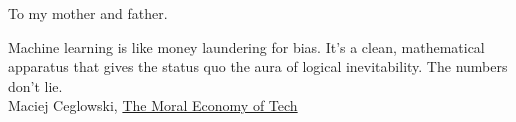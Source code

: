 

\copyrightpage  %

\commcertpage   %

\titlepage      %


\begin{dedication}		%
\begin{center}
    To my mother and father.
\end{center}
\end{dedication}

\begin{epigraph}		%
    \begin{center}
        Machine learning is like money laundering for bias.  It’s a clean, mathematical apparatus that gives the status quo the aura of logical inevitability. The numbers don’t lie.\\
        Maciej Ceglowski, \href{https://idlewords.com/talks/sase_panel.htm}{The Moral Economy of Tech}
    \end{center}
\end{epigraph}

